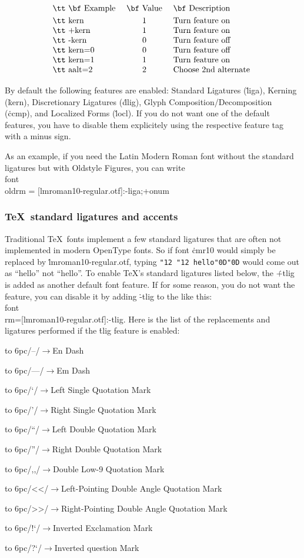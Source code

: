 $$\vbox{\halign{\tt #\hfil\quad & \hfil #\hfil\quad &#\hfil\cr
{\bf Example} & {\bf Value} & {\bf Description} \cr
\noalign{\smallskip}
kern   & 1  &  Turn feature on \cr
+kern  & 1 & Turn feature on \cr
-kern  & 0 & Turn feature off \cr
kern=0 & 0 & Turn feature off \cr
kern=1 & 1 & Turn feature on \cr
aalt=2 & 2 & Choose 2nd alternate \cr
}}$$



By default the following features are enabled:
Standard Ligatures (\.{liga}), Kerning (\.{kern}),
Discretionary Ligatures  (\.{dlig}),
Glyph Composition/Decomposition (\.{ccmp}), and  Localized Forms (\.{locl}).
If you do not want one of the default features, you have to disable them explicitely
using the respective feature tag with a minus sign.

As an example, if you need the Latin Modern Roman font without the standard ligatures
but with Oldstyle Figures, you can write
\medskip
\.{\\font\\oldrm = [lmroman10-regular.otf]:-liga;+onum}
\medskip

\subsubsection{\TeX\ standard ligatures and accents}
Traditional \TeX\ fonts implement a few standard ligatures
that are often not implemented in modern OpenType fonts. So if font \.{cmr10}
would simply be replaced by \.{lmroman10-regular.otf},
typing {\tt \char"12 \char"12 hello\char"0D\char"0D}
would come out as {\lmr ``hello''} not {\lmrtlig ``hello''}.
To enable \TeX's standard ligatures listed below, the  \.{+tlig}
is added as another default font feature. If for some reason, you do not want
the feature, you can disable it by adding \.{-tlig} to the
 like this: \.{\\font\\rm=[lmroman10-regular.otf]:-tlig}.
Here is the list of the replacements and ligatures performed if the \.{tlig}
feature is enabled:
\medskip
{\parindent=0pt\parskip=0pt
\def\showtlig#1#2{\leavevmode\hangindent=6pc
 \hangafter=1\hbox to 6pc{{\verbatim/#1/}\hss${}\rightarrow{}$\hss{\lmrtlig #1}\quad}#2\par}
\showtlig{--}{En Dash}
\showtlig{---}{Em Dash}
\showtlig{`}{Left Single Quotation Mark}
\showtlig{'}{Right Single Quotation Mark}
\showtlig{``}{Left Double Quotation Mark}
\showtlig{''}{Right Double Quotation Mark}
\showtlig{,,}{Double Low-9 Quotation Mark}
\showtlig{<<}{Left-Pointing Double Angle Quotation Mark}
\showtlig{>>}{Right-Pointing Double Angle Quotation Mark}
\leavevmode\hangindent=6pc
\hbox to 6pc{{\verbatim/!`/}\hss${}\rightarrow{}$\quad}Inverted Exclamation Mark\par
\leavevmode\hangindent=6pc
\hbox to 6pc{{\verbatim/?`/}\hss${}\rightarrow{}$\quad}Inverted question Mark\par
}
\medskip

